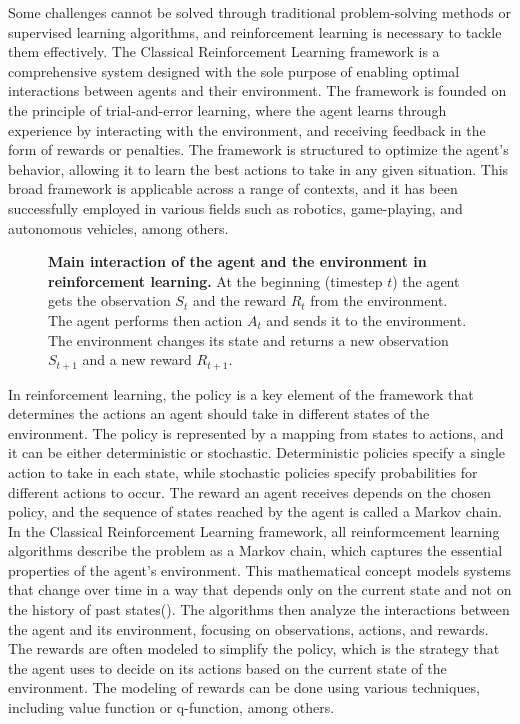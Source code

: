 Some challenges cannot be solved through traditional problem-solving methods or supervised learning algorithms, and reinforcement learning is necessary to tackle them effectively. 
The Classical Reinforcement Learning framework is a comprehensive system designed with the sole purpose of enabling optimal interactions between agents and their environment. The framework is founded on the principle of trial-and-error learning, where the agent learns through experience by interacting with the environment, and receiving feedback in the form of rewards or penalties. The framework is structured to optimize the agent's behavior, allowing it to learn the best actions to take in any given situation. This broad framework is applicable across a range of contexts, and it has been successfully employed in various fields such as robotics, game-playing, and autonomous vehicles, among others.

\begin{figure}[!ht]
\centering
{}
\caption[Main interaction of the agent and the environment in reinforcement learning]{
  \textbf{Main interaction of the agent and the environment in reinforcement learning.}
  At the beginning (timestep $t$) the agent gets the observation $S_t$ and the reward $R_t$ from the environment. The agent performs then action $A_t$ and sends it to the environment. The environment changes its state and returns a new observation $S_{t+1}$ and a new reward $R_{t+1}$.
 }
\label{fig:RL_main_loop}
\end{figure}


In reinforcement learning, the policy is a key element of the framework that determines the actions an agent should take in different states of the environment. The policy is represented by a mapping from states to actions, and it can be either deterministic or stochastic. Deterministic policies specify a single action to take in each state, while stochastic policies specify probabilities for different actions to occur. The reward an agent receives depends on the chosen policy, and the sequence of states reached by the agent is called a Markov chain. In the Classical Reinforcement Learning framework, all reinformcement learning algorithms describe the problem as a Markov chain, which captures the essential properties of the agent's environment. This mathematical concept models systems that change over time in a way that depends only on the current state and not on the history of past states(\cite{sutton_reinforcement_2018}). The algorithms then analyze the interactions between the agent and its environment, focusing on observations, actions, and rewards. The rewards are often modeled to simplify the policy, which is the strategy that the agent uses to decide on its actions based on the current state of the environment. The modeling of rewards can be done using various techniques, including value function or q-function, among others.


